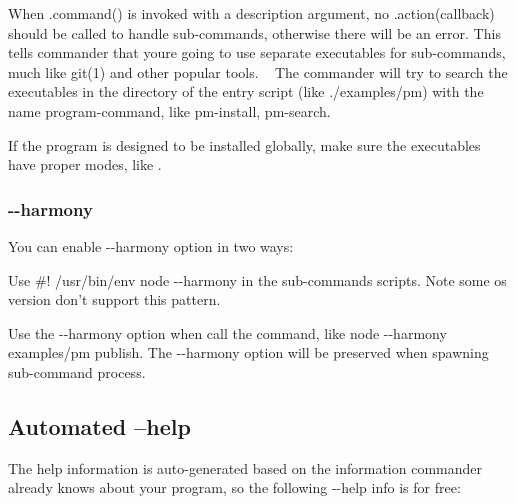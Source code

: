 When {\ttfamily .command()} is invoked with a description argument, no {\ttfamily .action(callback)} should be called to handle sub-\/commands, otherwise there will be an error. This tells commander that you\textquotesingle{}re going to use separate executables for sub-\/commands, much like {\ttfamily git(1)} and other popular tools. ~\newline
The commander will try to search the executables in the directory of the entry script (like {\ttfamily ./examples/pm}) with the name {\ttfamily program-\/command}, like {\ttfamily pm-\/install}, {\ttfamily pm-\/search}.

If the program is designed to be installed globally, make sure the executables have proper modes, like {}.

\subsubsection*{{\ttfamily -\/-\/harmony}}

You can enable {\ttfamily -\/-\/harmony} option in two ways\+:
\begin{DoxyItemize}
\item Use {\ttfamily \#! /usr/bin/env node -\/-\/harmony} in the sub-\/commands scripts. Note some os version don’t support this pattern.
\item Use the {\ttfamily -\/-\/harmony} option when call the command, like {\ttfamily node -\/-\/harmony examples/pm publish}. The {\ttfamily -\/-\/harmony} option will be preserved when spawning sub-\/command process.
\end{DoxyItemize}

\subsection*{Automated --help}

The help information is auto-\/generated based on the information commander already knows about your program, so the following {\ttfamily -\/-\/help} info is for free\+:




